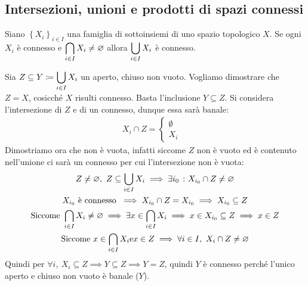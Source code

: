 \subsection{Intersezioni, unioni e prodotti di spazi connessi}
\begin{theorema} \label{unione sottospazi connessi}
	Siano $\left\{ X_i \right\}_{i\in I}$ una famiglia di sottoinsiemi di uno spazio topologico $X$. Se ogni $X_i$ è connesso e $\displaystyle\mathop{{\bigcap}}\displaylimits_{i\in I}X_i\neq\varnothing$ allora $\displaystyle\mathop{{\bigcup}}\displaylimits_{i\in I}X_i$ è connesso.	
\end{theorema}
\begin{demonstration}
	Sia $\displaystyle Z\subseteq Y\coloneqq \mathop{{\bigcup}}\displaylimits_{i\in I}X_i$ un aperto, chiuso non vuoto. Vogliamo dimostrare che $Z=X$, cosicché $X$ risulti connesso. Basta l'inclusione $Y\subseteq Z$.\newline
	Si considera l'intersezione di $Z$ e di un connesso, dunque essa sarà banale:
	\begin{gather*}
		X_i \cap Z = \begin{cases}
			\emptyset & \\
			X_i	&		
		\end{cases}
	\end{gather*}
	Dimostriamo ora che non è vuota, infatti siccome $Z$ non è vuoto ed è contenuto nell'unione ci sarà un connesso per cui l'intersezione non è vuota:
		\begin{gather*}
			Z\neq\varnothing, \ Z\subseteq \mathop{{\bigcup}}\displaylimits_{i\in I}X_i \implies \exists i_0 \ \colon X_{i_0}\cap Z\neq \varnothing	\\
			X_{i_0} \text{ è connesso } \implies X_{i_0}\cap Z=X_{i_0} \implies X_{i_0}\subseteq Z \\
			\text{Siccome } \mathop{{\bigcap}}\displaylimits_{i\in I}X_i\neq\varnothing \implies \exists x\in\mathop{{\bigcap}}\displaylimits_{i\in I}X_i \implies x\in X_{i_0}\subseteq Z \implies x\in Z	\\
			\text{Siccome } x\in\mathop{{\bigcap}}\displaylimits_{i\in I}X_i \text{e} x\in Z \implies \forall i\in I, \ X_i\cap Z\neq\varnothing
		\end{gather*}
	Quindi per $\forall i, \ X_i\subseteq Z \implies Y\subseteq Z \implies Y=Z$, quindi $Y$ è connesso perché l'unico aperto e chiuso non vuoto è banale ($Y$).
\end{demonstration}

